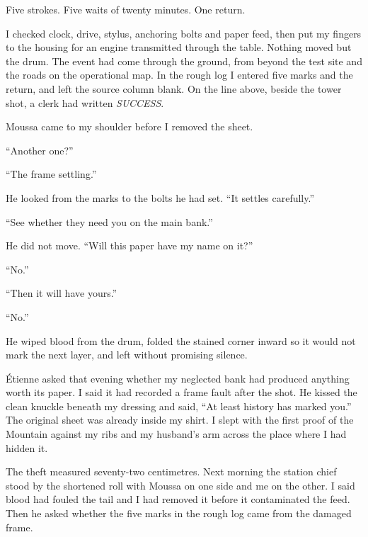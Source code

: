 Five strokes. Five waits of twenty minutes. One return.\par

I checked clock, drive, stylus, anchoring bolts and paper feed, then put my fingers to the housing for an engine transmitted through the table. Nothing moved but the drum. The event had come through the ground, from beyond the test site and the roads on the operational map. In the rough log I entered five marks and the return, and left the source column blank. On the line above, beside the tower shot, a clerk had written \emph{SUCCESS}.\par

Moussa came to my shoulder before I removed the sheet.\par

“Another one?”\par

“The frame settling.”\par

He looked from the marks to the bolts he had set. “It settles carefully.”\par

“See whether they need you on the main bank.”\par

He did not move. “Will this paper have my name on it?”\par

“No.”\par

“Then it will have yours.”\par

“No.”\par

He wiped blood from the drum, folded the stained corner inward so it would not mark the next layer, and left without promising silence.\par

Étienne asked that evening whether my neglected bank had produced anything worth its paper. I said it had recorded a frame fault after the shot. He kissed the clean knuckle beneath my dressing and said, “At least history has marked you.” The original sheet was already inside my shirt. I slept with the first proof of the Mountain against my ribs and my husband's arm across the place where I had hidden it.\par

The theft measured seventy-two centimetres. Next morning the station chief stood by the shortened roll with Moussa on one side and me on the other. I said blood had fouled the tail and I had removed it before it contaminated the feed. Then he asked whether the five marks in the rough log came from the damaged frame.\par

